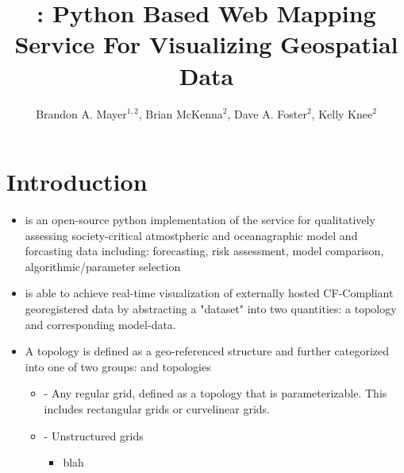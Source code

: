 \documentclass[noback,noborder,portrait,twocolumn]{cuposter}
\begin{document}

\newcommand{\figspace}{\vskip 20pt plus 5pt minus 5pt}
\newcommand{\captionspace}{\vskip 10pt plus 5pt minus 5pt}


\newcommand{\getIncFigcounter}{\stepcounter{figcounter}\thefigcounter}
\title{\sciwms{}: Python Based Web Mapping Service For Visualizing Geospatial Data}

\newcommand{\getIncTablecounter}{\stepcounter{tablecounter}\thetablecounter}

\author{Brandon A. Mayer$^{1,2}$, Brian McKenna$^{2}$, Dave A. Foster$^{2}$, Kelly Knee$^{2}$}
\address{Brown University, Providence RI, USA$^{1}$; RPS-ASA, South Kingston RI, USA$^{2}$}

\makeposter

\section{Introduction}
\begin{itemize}
  \item \sciwms{} is an open-source python implementation of the \ogc{} \wms{} service for qualitatively assessing society-critical atmostpheric and oceanagraphic model and forcasting data including: forecasting, risk assessment, model comparison, algorithmic/parameter selection
  \item \sciwms{} is able to achieve real-time visualization of
    externally hosted CF-Compliant georegistered data by abstracting a
    "dataset" into two quantities: a topology and corresponding
    model-data.
  \item A topology is defined as a geo-referenced structure and further categorized into one of two groups: \cgrid{} and \ugrid{} topologies
    \begin{itemize}
    \item \cgrid{} - Any regular grid, defined as a topology that is
      parameterizable. This includes rectangular grids or curvelinear
      grids.
    \item \ugrid{} - Unstructured grids
      \begin{itemize}
        \item blah
      \end{itemize}
    \end{itemize}
    
\end{itemize}
\end{document}
